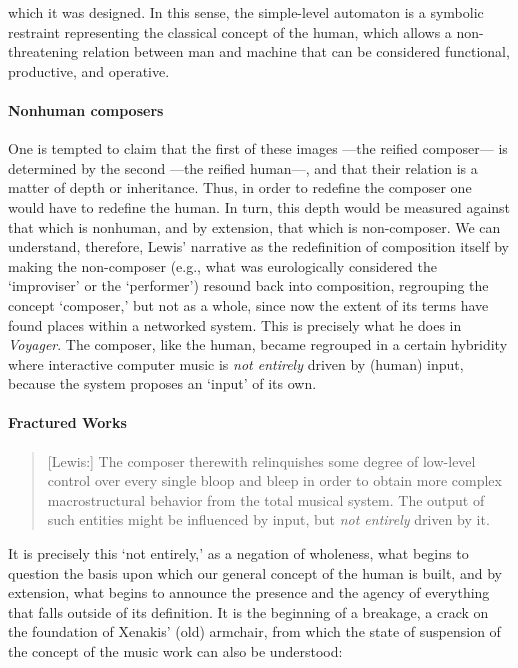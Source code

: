 which it was designed. In this sense, the simple-level automaton is a symbolic restraint representing the classical concept of the human, which allows a non-threatening relation between man and machine that can be considered functional, productive, and operative.

\paragraph{Nonhuman composers}
One is tempted to claim that the first of these images ---the reified composer--- is determined by the second ---the reified human---, and that their relation is a matter of depth or inheritance. Thus, in order to redefine the composer one would have to redefine the human. In turn, this depth would be measured against that which is nonhuman, and by extension, that which is non-composer. We can understand, therefore, Lewis' narrative as the redefinition of composition itself by making the non-composer (e.g., what was eurologically considered the `improviser' or the `performer') resound back into composition, regrouping the concept `composer,' but not as a whole, since now the extent of its terms have found places within a networked system. This is precisely what he does in \textit{Voyager}. The composer, like the human, became regrouped in a certain hybridity where interactive computer music is \textit{not entirely} driven by (human) input, because the system proposes an `input' of its own. 

\paragraph{Fractured Works}

\begin{quote}
	[Lewis:] The composer therewith relinquishes some degree of low-level control over every single bloop and bleep in order to obtain more complex macrostructural behavior from the total musical system. The output of such entities might be influenced by input, but \textit{not entirely} driven by it. \im \parencite[11]{Lew93:Put}
\end{quote}

It is precisely this `not entirely,' as a negation of wholeness, what begins to question the basis upon which our general concept of the human is built, and by extension, what begins to announce the presence and the agency of everything that falls outside of its definition. It is the beginning of a breakage, a crack on the foundation of Xenakis' (old) armchair, from which the state of suspension of the concept of the music work can also be understood:

